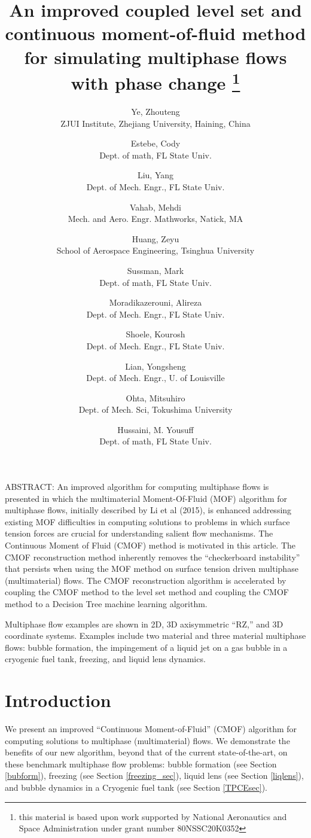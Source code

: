 \documentclass[]{article}
\title{An improved 
  coupled level set and continuous moment-of-fluid method 
  for simulating multiphase flows with phase change
  \thanks{this material is based upon work supported by National
   Aeronautics and Space Administration under grant number
   80NSSC20K0352}}
\author{
  Ye, Zhouteng \\
  ZJUI Institute, Zhejiang University, Haining, China
  \and
  Estebe, Cody \\
  Dept. of math, FL State Univ. 
  \and
  Liu, Yang \\
  Dept. of Mech. Engr., FL State Univ.
  \and
  Vahab, Mehdi \\
  Mech. and Aero. Engr. Mathworks, Natick, MA
  \and
  Huang, Zeyu \\
  School of Aerospace Engineering, Tsinghua University
  \and
  Sussman, Mark \\
  Dept. of math, FL State Univ. 
  \and
  Moradikazerouni, Alireza \\
  Dept. of Mech. Engr., FL State Univ.
  \and
  Shoele, Kourosh  \\
  Dept. of Mech. Engr., FL State Univ.
  \and
  Lian, Yongsheng \\
  Dept. of Mech. Engr., U. of Louisville
  \and
  Ohta, Mitsuhiro \\
  Dept. of Mech. Sci, Tokushima University 
  \and
  Hussaini, M. Yousuff \\ 
  Dept. of math, FL State Univ. 
}
\begin{document}
\maketitle

ABSTRACT:
An improved algorithm for computing multiphase flows is presented in which the multimaterial Moment-Of-Fluid (MOF) algorithm for multiphase flows, initially described by Li et al (2015), is enhanced addressing existing MOF difficulties in computing solutions to problems in which surface tension forces are crucial for understanding salient flow mechanisms.  The Continuous Moment of Fluid (CMOF) method is motivated in this article.  The CMOF reconstruction method inherently removes the ``checkerboard instability'' that persists when using the MOF method on surface tension driven multiphase (multimaterial) flows.  The CMOF reconstruction algorithm is accelerated by coupling the CMOF method to the level set method and coupling the CMOF method to a Decision Tree machine learning algorithm.

Multiphase flow examples are shown in 2D, 3D axisymmetric ``RZ,'' and 3D coordinate systems.  Examples include two material and three material multiphase flows: bubble formation, the impingement of a liquid jet on a gas bubble in a cryogenic fuel tank, freezing, and liquid lens dynamics.
\linenumbers
\section{Introduction}
We present an improved ``Continuous Moment-of-Fluid'' (CMOF) algorithm
for computing solutions to multiphase (multimaterial) flows.  We 
demonstrate the benefits of our new algorithm, beyond that of the 
current state-of-the-art, on these benchmark multiphase flow
problems:
bubble formation\cite{helsby1955behaviour} (see Section \ref{bubform}),
freezing\cite{hu2010icing} (see Section \ref{freezing_sec}), 
liquid lens\cite{MIAO2021109358} (see Section \ref{liqlens}),
and bubble dynamics in a Cryogenic fuel 
tank\cite{bentz1993low} (see Section \ref{TPCEsec}).
\end{document}
